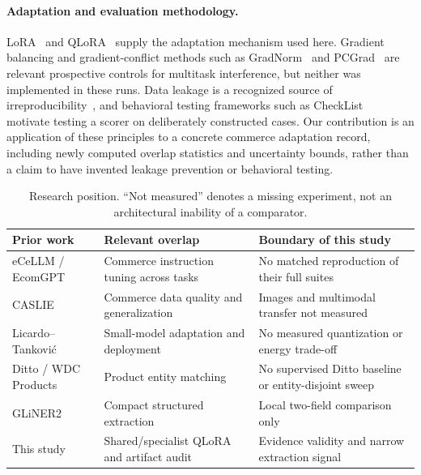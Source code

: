 \paragraph{Adaptation and evaluation methodology.}
LoRA~\cite{lora} and QLoRA~\cite{qlora} supply the adaptation mechanism used here. Gradient balancing and gradient-conflict methods such as GradNorm~\cite{gradnorm} and PCGrad~\cite{pcgrad} are relevant prospective controls for multitask interference, but neither was implemented in these runs. Data leakage is a recognized source of irreproducibility~\cite{leakage}, and behavioral testing frameworks such as CheckList~\cite{checklist} motivate testing a scorer on deliberately constructed cases. Our contribution is an application of these principles to a concrete commerce adaptation record, including newly computed overlap statistics and uncertainty bounds, rather than a claim to have invented leakage prevention or behavioral testing.

\begin{table}[t]
\centering\small
\caption{Research position. ``Not measured'' denotes a missing experiment, not an architectural inability of a comparator.}
\label{tab:position}
\begin{tabularx}{\textwidth}{P{2.3cm}YY}
\toprule
Prior work & Relevant overlap & Boundary of this study \\
\midrule
eCeLLM / EcomGPT & Commerce instruction tuning across tasks & No matched reproduction of their full suites \\
CASLIE & Commerce data quality and generalization & Images and multimodal transfer not measured \\
Licardo--Tankovi\'{c} & Small-model adaptation and deployment & No measured quantization or energy trade-off \\
Ditto / WDC Products & Product entity matching & No supervised Ditto baseline or entity-disjoint sweep \\
GLiNER2 & Compact structured extraction & Local two-field comparison only \\
This study & Shared/specialist QLoRA and artifact audit & Evidence validity and narrow extraction signal \\
\bottomrule
\end{tabularx}
\end{table}
